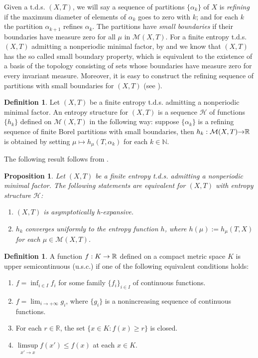 \documentclass[12pt]{amsart}
\newtheorem{prop}[thm]{Proposition}
\theoremstyle{definition} \theoremstyle{question}
\newtheorem{defn}[thm]{Definition}
\numberwithin{equation}{section}
\begin{document}
Given a t.d.s. $(X, T)$, we will say a sequence of partitions
$\{\alpha_k\}$ of $X$ is {\it refining} if the maximum diameter of
elements of $\alpha_k$ goes to zero with $k$; and for each $k$ the
partition $\alpha_{k+1}$ refines $\alpha_k$. The partitions have
{\it small boundaries} if their boundaries have measure zero for all
$\mu$ in $\mathcal{M}(X,T)$. For a finite entropy t.d.s. $(X,T)$
admitting a nonperiodic minimal factor, by \cite[ Theorem 6.2]{L2}
and \cite[Theorem 4.2]{LW} we know that $(X,T)$ has the so called
small boundary property, which is equivalent to the existence of a basis of
the topology consisting of sets whose boundaries have measure zero
for every invariant measure. Moreover, it is easy to construct the
refining sequence of partitions with small boundaries for $(X, T)$ (see \cite[Theorem
7.6 (3)]{BD}).

\begin{defn} Let $(X,T)$ be a finite entropy t.d.s. admitting a
nonperiodic minimal factor. An entropy structure for $(X, T)$  is a
sequence $\mathcal{H}$ of functions $\{h_k\}$ defined on
$\mathcal{M}(X,T)$ in the following way: suppose $\{\alpha_k\}$ is a
refining sequence of finite Borel partitions with small boundaries, then $h_k: \mathcal{M}(X,T){\rightarrow} {\Bbb R} $ is obtained by setting
$\mu\mapsto h_\mu(T,\alpha_k)$ for each $k\in {\mathbb N}$.
\end{defn}

The following result follows from \cite[Theorem 8.6]{BD}.
\begin{prop}  \label{asy-ch}Let $(X,T)$ be a  finite entropy t.d.s. admitting a
nonperiodic minimal factor. The following statements are equivalent for $(X,T)$
with entropy structure $\mathcal{H}$:
\begin{enumerate}
\item $(X,T)$ is asymptotically h-expansive.
\item  $h_k$ converges uniformly to the entropy function $h$, where
$h(\mu):=h_{\mu}(T,X)$ for each $\mu\in \mathcal{M}(X,T)$.
\end{enumerate}
\end{prop}

\begin{defn} \label{de1} A function $f : K\rightarrow {\Bbb R}$ defined on a compact metric space
$K$ is upper semicontinuous (u.s.c.) if one of the following
equivalent conditions holds:
\begin{enumerate}
\item $f = \inf_{i\in I} f_i$ for some family $\{f_i\}_{i\in I}$ of continuous functions.

\item $f = \lim_{i\rightarrow +\infty} g_i$, where $\{g_i\}$ is a nonincreasing sequence of continuous functions.

\item For each $r \in \mathbb{R}$, the set $\{x\in K: f(x) \ge  r\}$ is closed.

\item  $\limsup\limits_{x'\rightarrow x} f(x') \le f(x)$ at each $x\in K$.
\end{enumerate}
\end{defn}
\end{document}
